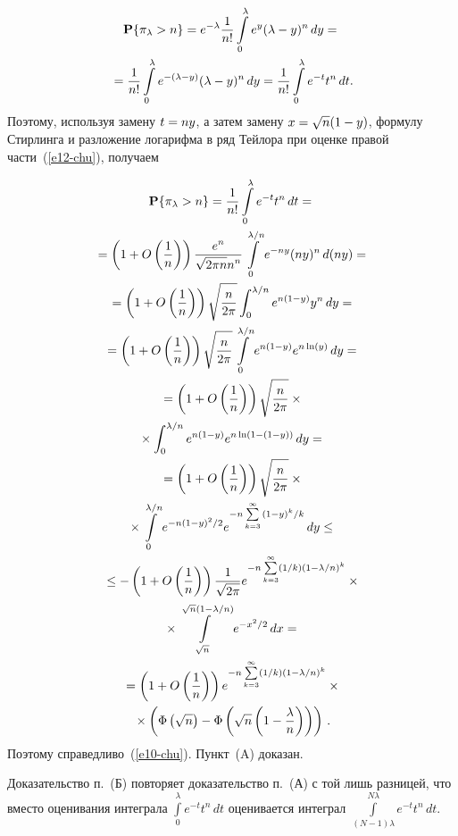 \begin{multicols}{2}
\noindent
\begin{multline}
\mathbf{P}\{\pi_{\lambda}>n\}=e^{-\lambda}\fr{1}{n!}
\int\limits_0^{\lambda}e^y(\lambda-y)^n\,dy={}\\
{}=
\fr{1}{n!}\int\limits_0^{\lambda}e^{-(\lambda-y)}(\lambda-y)^n\,dy=
\fr{1}{n!}\int\limits_0^{\lambda}e^{-t}t^n\,dt.\label{e12-chu}
\end{multline}
 Поэтому, используя замену
$t\hm=ny$, а затем замену $x\hm=\sqrt{n}(1-y)$, формулу Стирлинга и
разложение логарифма в ряд Тейлора при оценке правой час\-ти~(\ref{e12-chu}),
получаем

\noindent
\begin{multline*}
\mathbf{P}\{\pi_{\lambda}>n\}=\fr{1}{n!}\int\limits_0^{\lambda}e^{-t}t^n\,dt={}\\
{}=
\left(1+O\left(\fr{1}{n}\right)\right)
\fr{e^n}{\sqrt{2\pi n}n^n}\int\limits_0^{{\lambda}/{n}}e^{-ny}(ny)^n\,d(ny)={}\\
{}=
\left(1+O\left(\fr{1}{n}\right)\right) \sqrt{\fr{n}{2\pi}}
\int_0^{{\lambda}/{n}}e^{n(1-y)}y^n\,dy={}\\
{}=\left(1+O\left(\fr{1}{n}\right)\right)
\sqrt{\fr{n}{2\pi}}
\int\limits_0^{{\lambda}/{n}}e^{n(1-y)}e^{n\ln(y)}\,dy={}\\
{}=
\left(1+O\left(\fr{1}{n}\right)\right) \sqrt{\fr{n}{2\pi}}\times{}\\
{}\times
\int_0^{{\lambda}/{n}}e^{n(1-y)}e^{n\ln(1-(1-y))}\,dy={}\\
{}=
\left(1+O\left(\fr{1}{n}\right)\right) \sqrt{\fr{n}{2\pi}}\times{}\\
{}\times
\int\limits_0^{{\lambda}/{n}}e^{-n{(1-y)^2}/2}
e^{-n\sum\limits_{k=3}^{\infty}{(1-y)^k}/{k}}\,dy
\le {}\\
{}\le-\left(1+O\left(\fr{1}{n}\right)\right)
\fr{1}{\sqrt{2\pi}}e^{-n\sum\limits_{k=3}^{\infty}(1/k)\left(1-{\lambda}/{n}\right)^k}\times{}\\
{}\times
\int\limits_{\sqrt{n}}^{\sqrt{n}\left(1-{\lambda}/{n}\right)}e^{-{x^2}/{2}}\,dx={}\\
{}=
\left(1+O\left(\fr{1}{n}\right)\right)e^{-n\sum\limits_{k=3}^{\infty}({1}/{k})\left(1-{\lambda}/{n}
\right)^k}\times{}\\
{}\times
\left(\Phi\left(\sqrt{n}\right)-\Phi\left(\sqrt{n}\left(1-\fr{\lambda}{n}\right)\right)\right)\,.
\end{multline*}
Поэтому справедливо~(\ref{e10-chu}). Пункт~(A) доказан.

Доказательство п.~(Б) повторяет доказательство п.~(А) с
той лишь разницей, что вместо оценивания интеграла
$\int\limits_0^{\lambda}e^{-t}t^n\,dt$  оценивается интеграл
$\int\limits_{(N-1)\lambda}^{N\lambda}e^{-t}t^n\,dt$.


\end{multicols}
